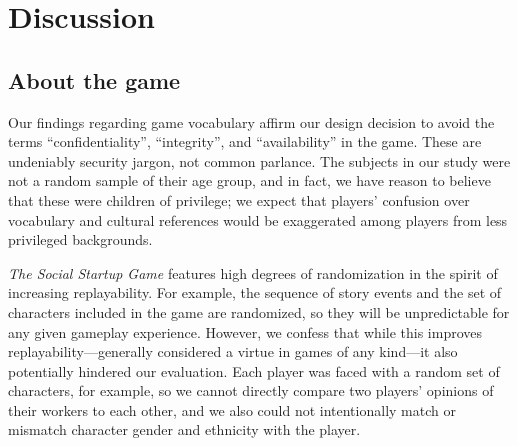 \documentclass[letterpaper]{article}
\begin{document}
\section{Discussion}
\label{sec:discussion}

\subsection{About the game}

Our findings regarding game vocabulary affirm our design decision
to avoid the terms ``confidentiality'', ``integrity'', and ``availability''
in the game. These are undeniably security jargon, not common parlance.
The subjects in our study were not a random sample of their age group,
and in fact, we have reason to believe that these were children of
privilege; we expect that players' confusion over vocabulary
and cultural references would be exaggerated among players from
less privileged backgrounds.

\textit{The Social Startup Game} features high degrees of randomization
in the spirit of increasing replayability. For example, the sequence
of story events and the set of characters included in the game are randomized,
so they will be unpredictable for any given gameplay experience.
However, we confess that while this improves replayability---generally
considered a virtue in games of any kind---it also potentially hindered
our evaluation. Each player was faced with a random set of characters,
for example, so we cannot directly compare two players' opinions of their
workers to each other, and we also could not intentionally match
or mismatch character gender and ethnicity with the player.
\end{document}
